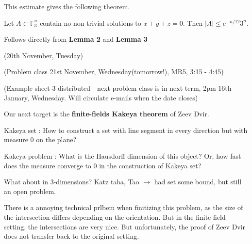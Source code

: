 \documentclass[12pt,a4paper]{report}
\newenvironment{proof}
{\begin{changemargin}{1cm}{0.5cm}
	}%
	{\end{changemargin}
}
\begin{document}
This estimate gives the following theorem. 
\s

 Let $A\subset \mathbb{F}^n_3$ contain no non-trivial solutions to $x+y+z=0$. Then $|A| \leq e^{-n/12} 3^n$.
\begin{proof}
\pf Follows directly from \textbf{Lemma 2} and \textbf{Lemma 3} 

\eop
\end{proof}
\s

\newday

(20th November, Tuesday)
\s

(Problem class 21st November, Wednesday(tomorrow!), MR5, 3:15 - 4:45)

(Example sheet 3 distributed - next problem class is in next term, 2pm 16th January, Wednesday. Will circulate e-mails when the date closes)
\s

Our next target is the \textbf{finite-fields Kakeya theorem} of Zeev Dvir.
\s

Kakeya set : How to construct a set with line segment in every direction but with measure 0 on the plane? 

Kakeya problem : What is the Hausdorff dimension of this object? Or, how fast does the measure converge to 0 in the construction of Kakeya set? 

What about in 3-dimensions? Katz taba, Tao $\rightarrow$ had set some bound, but still an open problem.

\quad There is a annoying technical prlbem when finitizing this problem, as the size of the intersection differs depending on the orientation. But in the finite field setting, the intersections are very nice. But unfortunately, the proof of Zeev Dvir does not transfer back to the original setting.
\s
\end{document}
